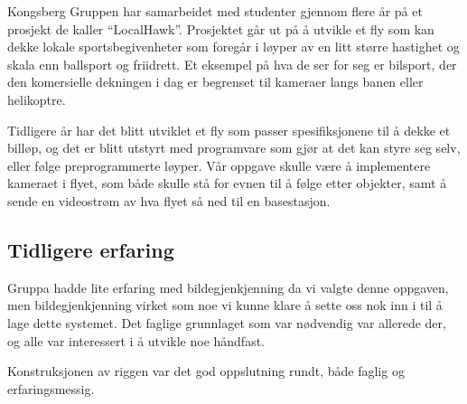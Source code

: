 Kongsberg Gruppen har samarbeidet med studenter gjennom flere år på et prosjekt de kaller ``LocalHawk''. Prosjektet går ut på å utvikle et fly som kan dekke lokale sportsbegivenheter som foregår i løyper av en litt større hastighet og skala enn ballsport og friidrett. Et eksempel på hva de ser for seg er bilsport, der den komersielle dekningen i dag er begrenset til kameraer langs banen eller helikoptre. 

Tidligere år har det blitt utviklet et fly som passer spesifiksjonene til å dekke et billøp, og det er blitt utstyrt med programvare som gjør at det kan styre seg selv, eller følge preprogrammerte løyper. Vår oppgave skulle være å implementere kameraet i flyet, som både skulle stå for evnen til å følge etter objekter, samt å sende en videostrøm av hva flyet så ned til en basestasjon.

\subsection{Tidligere erfaring}

Gruppa hadde lite erfaring med bildegjenkjenning da vi valgte denne oppgaven, men bildegjenkjenning virket som noe vi kunne klare å sette oss nok inn i til å lage dette systemet. Det faglige grunnlaget som var nødvendig var allerede der, og alle var interessert i å utvikle noe håndfast.

Konstruksjonen av riggen var det god oppslutning rundt, både faglig og erfaringsmessig. 